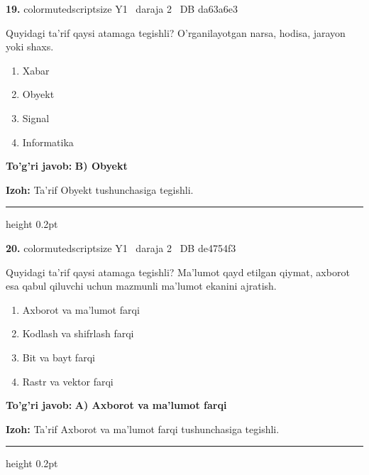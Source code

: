 \documentclass[10pt,a4paper,oneside]{article}
\begin{document}
\noindent\textbf{\color{ink}19.}  {color{muted}scriptsize Y1 \textbullet\ daraja 2 \textbullet\ DB da63a6e3}
\par
Quyidagi ta'rif qaysi atamaga tegishli? O'rganilayotgan narsa, hodisa, jarayon yoki shaxs.
\begin{enumerate}[label=\Alph*),leftmargin=9mm]
\item Xabar
\item Obyekt
\item Signal
\item Informatika
\end{enumerate}
\begin{tcolorbox}[enhanced,breakable,colback=teal!4,colframe=teal!50!black,boxrule=0.5pt,arc=1.1mm,left=3mm,right=3mm,top=1.7mm,bottom=1.7mm,before skip=2mm,after skip=2mm]
\textbf{\color{teal}To'g'ri javob:} \textbf{B) Obyekt}
\par\smallskip
\textbf{Izoh:} Ta'rif Obyekt tushunchasiga tegishli.
\end{tcolorbox}
\vspace{2mm}\hrule height 0.2pt \vspace{3mm}

\noindent\textbf{\color{ink}20.}  {color{muted}scriptsize Y1 \textbullet\ daraja 2 \textbullet\ DB de4754f3}
\par
Quyidagi ta'rif qaysi atamaga tegishli? Ma'lumot qayd etilgan qiymat, axborot esa qabul qiluvchi uchun mazmunli ma'lumot ekanini ajratish.
\begin{enumerate}[label=\Alph*),leftmargin=9mm]
\item Axborot va ma'lumot farqi
\item Kodlash va shifrlash farqi
\item Bit va bayt farqi
\item Rastr va vektor farqi
\end{enumerate}
\begin{tcolorbox}[enhanced,breakable,colback=teal!4,colframe=teal!50!black,boxrule=0.5pt,arc=1.1mm,left=3mm,right=3mm,top=1.7mm,bottom=1.7mm,before skip=2mm,after skip=2mm]
\textbf{\color{teal}To'g'ri javob:} \textbf{A) Axborot va ma'lumot farqi}
\par\smallskip
\textbf{Izoh:} Ta'rif Axborot va ma'lumot farqi tushunchasiga tegishli.
\end{tcolorbox}
\vspace{2mm}\hrule height 0.2pt \vspace{3mm}
\end{document}
